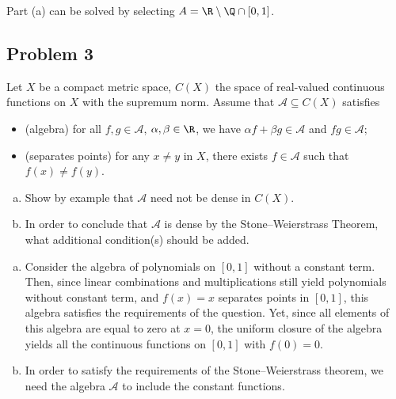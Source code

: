 \documentclass[10pt]{mypackage}
\begin{document}
\begin{remark}
  Part (a) can be solved by selecting $A = \R\setminus \Q\cap [0,1]$.
\end{remark}

\subsection{Problem 3}%
\begin{problem}
  Let $X$ be a compact metric space, $C(X)$ the space of real-valued continuous functions on $X$ with the supremum norm. Assume that $\mathcal{A}\subseteq C(X)$ satisfies
  \begin{itemize}
    \item (algebra) for all $f,g\in \mathcal{A}$, $\alpha,\beta\in \R$, we have $\alpha f + \beta g \in \mathcal{A}$ and $fg\in \mathcal{A}$;
    \item (separates points) for any $x\neq y$ in $X$, there exists $f\in \mathcal{A}$ such that $f(x)\neq f(y)$.
  \end{itemize}
  \begin{enumerate}[(a)]
    \item Show by example that $\mathcal{A}$ need not be dense in $C(X)$.
    \item In order to conclude that $\mathcal{A}$ is dense by the Stone--Weierstrass Theorem, what additional condition(s) should be added.
  \end{enumerate}
\end{problem}
\begin{enumerate}[(a)]
  \item Consider the algebra of polynomials on $[0,1]$ without a constant term. Then, since linear combinations and multiplications still yield polynomials without constant term, and $f(x) = x$ separates points in $[0,1]$, this algebra satisfies the requirements of the question. Yet, since all elements of this algebra are equal to zero at $x= 0$, the uniform closure of the algebra yields all the continuous functions on $[0,1]$ with $f(0) = 0$.
  \item In order to satisfy the requirements of the Stone--Weierstrass theorem, we need the algebra $\mathcal{A}$ to include the constant functions.
\end{enumerate}
\end{document}
